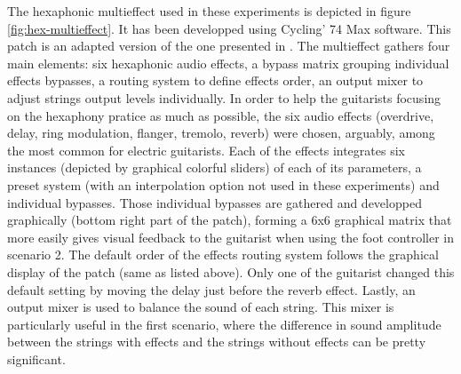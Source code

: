 \documentclass{article}
\begin{document}
The hexaphonic multieffect used in these experiments is depicted in figure \ref{fig:hex-multieffect}. It has been developped using Cycling' 74 Max software. This patch is an adapted version of the one presented in \cite{Reboursiere2020_Puzzle_eng}. The multieffect gathers four main elements: six hexaphonic audio effects, a bypass matrix grouping individual effects bypasses, a routing system to define effects order, an output mixer to adjust strings  output levels individually. 
In order to help the guitarists focusing on the hexaphony pratice as much as possible, the six audio effects (overdrive, delay, ring modulation, flanger, tremolo, reverb) were chosen, arguably, among the most common for electric guitarists. Each of the effects integrates six instances (depicted by graphical colorful sliders) of each of its parameters, a preset system (with an interpolation option not used in these experiments) and individual bypasses. 
Those individual bypasses are gathered and developped graphically (bottom right part of the patch), forming a 6x6 graphical matrix that more easily gives visual feedback to the guitarist when using the foot controller in scenario 2. 
The default order of the effects routing system follows the graphical display of the patch (same as listed above). Only one of the guitarist changed this default setting by moving the delay just before the reverb effect. 
Lastly, an output mixer is used to balance the sound of each string. This mixer is particularly useful in the first scenario, where the difference in sound amplitude between the strings with effects and the strings without effects can be pretty significant.
\end{document}
